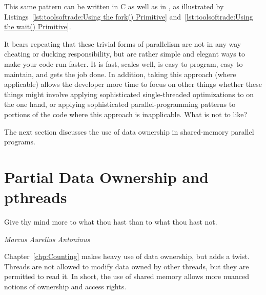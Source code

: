 \QuickQuizEnd

This same pattern can be written in C as well as in , as illustrated by
Listings~\ref{lst:toolsoftrade:Using the fork() Primitive}
and~\ref{lst:toolsoftrade:Using the wait() Primitive}.

It bears repeating that these trivial forms of parallelism are not in
any way cheating or ducking responsibility, but are rather simple and
elegant ways to make your code run faster.
It is fast, scales well, is easy to program, easy to maintain, and
gets the job done.
In addition, taking this approach (where applicable) allows the developer
more time to focus on other things whether these things might involve
applying sophisticated single-threaded optimizations to 
on the one hand, or applying sophisticated parallel-programming patterns
to portions of the code where this approach is inapplicable.
What is not to like?

The next section discusses the use of data ownership in shared-memory
parallel programs.

\section{Partial Data Ownership and pthreads}
\label{sec:owned:Partial Data Ownership and pthreads}
%
\epigraph{Give thy mind more to what thou hast than to what thou hast not.}
	 {\emph{Marcus Aurelius Antoninus}}

Chapter~\ref{chp:Counting} makes heavy use of data ownership,
but adds a twist.
Threads are not allowed to modify data owned by other threads,
but they are permitted to read it.
In short, the use of shared memory allows more nuanced notions
of ownership and access rights.


